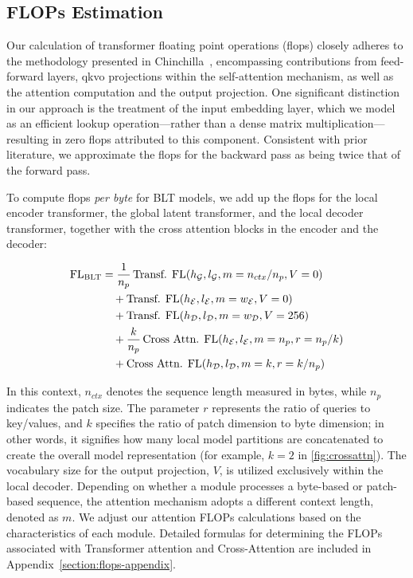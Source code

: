 \subsection{FLOPs Estimation} 
\label{section:flops}

Our calculation of transformer floating point operations (flops) closely adheres to the methodology presented in Chinchilla~\citep{hoffmann2022training}, encompassing contributions from feed-forward layers, qkvo projections within the self-attention mechanism, as well as the attention computation and the output projection. One significant distinction in our approach is the treatment of the input embedding layer, which we model as an efficient lookup operation—rather than a dense matrix multiplication—resulting in zero flops attributed to this component. Consistent with prior literature, we approximate the flops for the backward pass as being twice that of the forward pass.

To compute flops \textit{per byte} for {\textsc BLT} models, we add up the flops for the local encoder transformer, the global latent transformer, and the local decoder transformer, together with the cross attention blocks in the encoder and the decoder:

\begin{align}
    \text{FL}_{\text{{\textsc BLT}}} &= \frac{1}{n_p}\,\text{Transf. FL}(h_{\mathcal{G}}, l_{\mathcal{G}}, m = n_{ctx}/n_p, V = 0) \\
   &\quad + \text{Transf. FL}(h_{\mathcal{E}}, l_{\mathcal{E}}, m = w_{\mathcal{E}}, V = 0) \\
   &\quad + \text{Transf. FL}(h_{\mathcal{D}}, l_{\mathcal{D}}, m = w_{\mathcal{D}}, V = 256) \\
    &\quad + \frac{k}{n_p}\,\text{Cross Attn. FL}(h_{\mathcal{E}}, l_{\mathcal{E}}, m = n_p, r = n_p / k) \\
   &\quad + \text{Cross Attn. FL}(h_{\mathcal{D}}, l_{\mathcal{D}}, m = k, r = k/n_p)
\end{align}

In this context, $n_{ctx}$ denotes the sequence length measured in bytes, while $n_p$ indicates the patch size. The parameter $r$ represents the ratio of queries to key/values, and $k$ specifies the ratio of patch dimension to byte dimension; in other words, it signifies how many local model partitions are concatenated to create the overall model representation (for example, $k=2$ in \autoref{fig:crossattn}). The vocabulary size for the output projection, $V$, is utilized exclusively within the local decoder. Depending on whether a module processes a byte-based or patch-based sequence, the attention mechanism adopts a different context length, denoted as $m$. We adjust our attention FLOPs calculations based on the characteristics of each module. Detailed formulas for determining the FLOPs associated with Transformer attention and Cross-Attention are included in Appendix~\ref{section:flops-appendix}.

